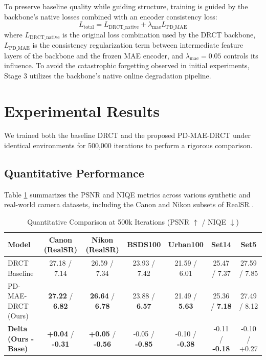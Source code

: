 \documentclass[journal,10pt,doublecolumn]{IEEEtran}
\begin{document}
To preserve baseline quality while guiding structure, training is guided by the backbone's native losses combined with an encoder consistency loss:
\begin{equation}
L_{\text{total}} = L_{\text{DRCT\_native}} + \lambda_{\text{mae}} L_{\text{PD\_MAE}}
\end{equation}
where $L_{\text{DRCT\_native}}$ is the original loss combination used by the DRCT backbone, $L_{\text{PD\_MAE}}$ is the consistency regularization term between intermediate feature layers of the backbone and the frozen MAE encoder, and $\lambda_{\text{mae}} = 0.05$ controls its influence. To avoid the catastrophic forgetting observed in initial experiments, Stage 3 utilizes the backbone's native online degradation pipeline.

\section{Experimental Results}
We trained both the baseline DRCT and the proposed PD-MAE-DRCT under identical environments for 500,000 iterations to perform a rigorous comparison.

\subsection{Quantitative Performance}
Table \ref{tab:results} summarizes the PSNR and NIQE \cite{mittal2012making} metrics across various synthetic and real-world camera datasets, including the Canon and Nikon subsets of RealSR \cite{cai2019toward}.

\begin{table}[htbp]
\centering
\caption{Quantitative Comparison at 500k Iterations (PSNR $\uparrow$ / NIQE $\downarrow$)}
\label{tab:results}
\begin{tabular}{lcccccc}
\toprule
\textbf{Model} & \textbf{Canon (RealSR)} & \textbf{Nikon (RealSR)} & \textbf{BSDS100} & \textbf{Urban100} & \textbf{Set14} & \textbf{Set5} \\
\midrule
DRCT Baseline & 27.18 / 7.14 & 26.59 / 7.34 & 23.93 / 7.42 & 21.59 / 6.01 & 25.47 / 7.37 & 27.59 / 7.85 \\
PD-MAE-DRCT (Ours) & \textbf{27.22} / \textbf{6.82} & \textbf{26.64} / \textbf{6.78} & 23.88 / \textbf{6.57} & 21.49 / \textbf{5.63} & 25.36 / \textbf{7.18} & 27.49 / 8.12 \\
\midrule
\textbf{Delta (Ours - Base)} & \textbf{+0.04} / \textbf{-0.31} & \textbf{+0.05} / \textbf{-0.56} & -0.05 / \textbf{-0.85} & -0.10 / \textbf{-0.38} & -0.11 / \textbf{-0.18} & -0.10 / +0.27 \\
\bottomrule
\end{tabular}
\end{table}
\end{document}
